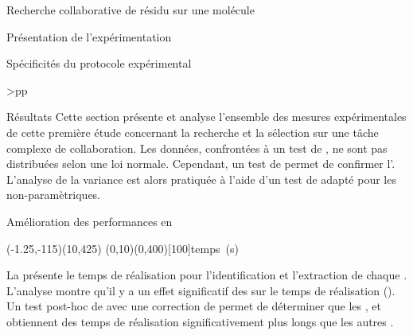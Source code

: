 \documentclass[myfrancais]{mythesis}
\begin{document}
\begin{mychapter}{Recherche collaborative de résidu sur une molécule}
\begin{mysection}{Présentation de l'expérimentation}
\begin{mysubsection}{Spécificités du protocole expérimental}
\begin{mytable}
\begin{mytabular}{>{\bfseries}p{\exponefirstcolumn}p{\exponesecondcolumn}}
{						} \\
						\mybottomrule
					\end{mytabular}
				\end{mytable}
			\end{mysubsection}
		\end{mysection}
		\begin{mysection}{Résultats}
			Cette section présente et analyse l'ensemble des mesures expérimentales de cette première étude concernant la recherche et la sélection sur une tâche complexe de collaboration.
			Les données, confrontées à un test de , ne sont pas distribuées selon une loi normale.
			Cependant, un test de  permet de confirmer l'.
			L'analyse de la variance est alors pratiquée à l'aide d'un test de  adapté pour les  non-paramètriques.
			\begin{mysubsection}{Amélioration des performances en }
				\begin{myfigure}
					\begin{myps}(-1.25,-115)(10,425)
						\myaxes(0,10){}(0,400)[100]{temps~(s)}
					\end{myps}
				\end{myfigure}

				La  présente le temps de réalisation  pour l'identification et l'extraction de chaque  .
				L'analyse montre qu'il y a un effet significatif des   sur le temps de réalisation  ().
				Un test post-hoc de  avec une correction de  permet de déterminer que les  ,  et  obtiennent des temps de réalisation significativement plus longs que les autres .


\end{mysubsection}
\end{mysection}
\end{mychapter}
\end{document}
